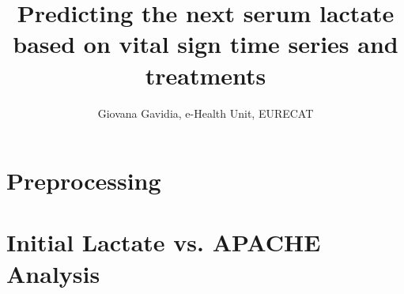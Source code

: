 \documentclass[10pt,a4paper]{article}
\begin{document}
\author{Giovana Gavidia, e-Health Unit, EURECAT}
\title{Predicting the next serum lactate based on vital sign time series and treatments}
\maketitle



\tableofcontents

\listoffigures
% 
\listoftables




\section{Preprocessing}
\section {Initial Lactate vs. APACHE Analysis}
\end{document}

